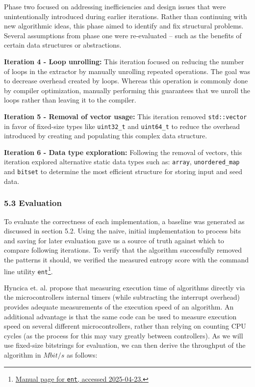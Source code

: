 Phase two focused on addressing inefficiencies and design issues that were unintentionally introduced during earlier iterations. Rather than continuing with new algorithmic ideas, this phase aimed to identify and fix structural problems. Several assumptions from phase one were re-evaluated -- such as the benefits of certain data structures or abstractions.

\textbf{Iteration 4 - Loop unrolling:} This iteration focused on reducing the number of loops in the extractor by manually unrolling repeated operations. The goal was to decrease overhead created by loops. Whereas this operation is commonly done by compiler optimization, manually performing this guarantees that we unroll the loops rather than leaving it to the compiler.

\textbf{Iteration 5 - Removal of vector usage:} This iteration removed \texttt{std::vector} in favor of fixed-size types like \texttt{uint32\_t} and \texttt{uint64\_t} to reduce the overhead introduced by creating and populating this complex data structure.

\textbf{Iteration 6 - Data type exploration:} Following the removal of vectors, this iteration explored alternative static data types such as: \texttt{array}, \texttt{unordered\_map} and \texttt{bitset} to determine the most efficient structure for storing input and seed data.

\hypertarget{evaluation}{%
\subsubsection{5.3 Evaluation}\label{evaluation}}

To evaluate the correctness of each implementation, a baseline was generated as discussed in section 5.2. Using the naive, initial implementation to process bits and saving for later evaluation gave us a source of truth against which to compare following iterations. To verify that the algorithm successfully removed the patterns it should, we verified the measured entropy score with the command line utility \texttt{ent}\footnote{\href{https://manpages.ubuntu.com/manpages/trusty/man1/ent.1.html}{Manual page for \texttt{ent}, accessed 2025-04-23.}}.

Hyncica et. al. \cite{micromeasurements} propose that measuring execution time of algorithms directly via the microcontrollers internal timers (while subtracting the interrupt overhead) provides adequate measurements of the execution speed of an algorithm. An additional advantage is that the same code can be used to measure execution speed on several different microcontrollers, rather than relying on counting CPU cycles (as the process for this may vary greatly between controllers). As we will use fixed-size bitstrings for evaluation, we can then derive the throughput of the algorithm in \(Mbit/s\) as follows:

